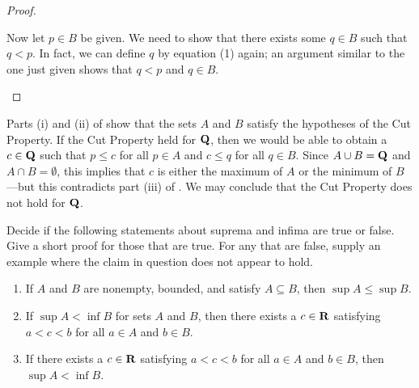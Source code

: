 \documentclass{lew98_solutions}
\begin{document}
\begin{solution}
\begin{enumerate}
\begin{proof}
\begin{enumerate}[label=(\roman*)]
                Now let \( p \in B \) be given. We need to show that there exists some \( q \in B \) such that \( q < p \). In fact, we can define \( q \) by equation (1) again; an argument similar to the one just given shows that \( q < p \) and \( q \in B \). \qedhere
            \end{enumerate}
        \end{proof}
        
        Parts (i) and (ii) of  show that the sets \( A \) and \( B \) satisfy the hypotheses of the Cut Property. If the Cut Property held for \( \mathbf{Q} \), then we would be able to obtain a \( c \in \mathbf{Q} \) such that \( p \leq c \) for all \( p \in A \) and \( c \leq q \) for all \( q \in B \). Since \( A \cup B = \mathbf{Q} \) and \( A \cap B = \emptyset \), this implies that \( c \) is either the maximum of \( A \) or the minimum of \( B \)---but this contradicts part (iii) of . We may conclude that the Cut Property does not hold for \( \mathbf{Q} \).
    \end{enumerate}
\end{solution}

\begin{exercise}
\label{ex:1.3.11}
    Decide if the following statements about suprema and infima are true or false. Give a short proof for those that are true. For any that are false, supply an example where the claim in question does not appear to hold.
    \begin{enumerate}
        \item If \( A \) and \( B \) are nonempty, bounded, and satisfy \( A \subseteq B \), then \( \sup A \leq \sup B \).

        \item If \( \sup A < \inf B \) for sets \( A \) and \( B \), then there exists a \( c \in \mathbf{R} \) satisfying \( a < c < b \) for all \( a \in A \) and \( b \in B \).

        \item If there exists a \( c \in \mathbf{R} \) satisfying \( a < c < b \) for all \( a \in A \) and \( b \in B \), then \( \sup A < \inf B \).
    \end{enumerate}
\end{exercise}
\end{document}
